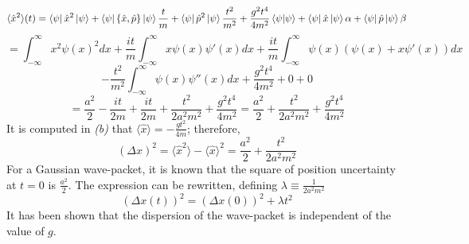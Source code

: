 \begin{sol}
\begin{enumerate}[label=\textbf{(\alph*)}]
\begin{equation}
	\langle\hat x^2\rangle(t)=\bra\psi\hat x^2\ket\psi+\bra\psi\{\hat x,\hat p\}\ket\psi\frac{t}{m}+\bra\psi\hat p^2\ket\psi\frac{t^2}{m^2}+\frac{g^2t^4}{4m^2}\braket{\psi}{\psi}+\bra\psi\hat x\ket\psi\alpha+\bra\psi\hat p\ket\psi\beta
\end{equation} 
\begin{equation}
	=\int_{-\infty}^\infty x^2\psi(x)^2dx+\frac{it}{m}\int_{-\infty}^\infty x\psi(x)\psi'(x)dx+\frac{it}{m}\int_{-\infty}^\infty\psi(x)(\psi(x)+x\psi'(x))dx
\end{equation}
\begin{equation}
	-\frac{t^2}{m^2}\int_{-\infty}^\infty\psi(x)\psi''(x)dx+\frac{g^2t^4}{4m^2}+0+0
\end{equation}
\begin{equation}
	=\frac{a^2}{2}-\frac{it}{2m}+\frac{it}{2m}+\frac{t^2}{2a^2m^2}+\frac{g^2t^4}{4m^2}=\frac{a^2}{2}+\frac{t^2}{2a^2m^2}+\frac{g^2t^4}{4m^2}
\end{equation} 
It is computed in \textit{(b)} that $\displaystyle{\langle\hat x\rangle=-\frac{gt^2}{4m}}$; therefore,
\begin{equation}
	(\Delta x)^2=\langle\hat x^2\rangle-\langle\hat x\rangle^2=\frac{a^2}{2}+\frac{t^2}{2a^2m^2}
\end{equation}
For a Gaussian wave-packet, it is known that the square of position uncertainty at $t=0$ is $\frac{a^2}{2}$. The expression can be rewritten, defining $\lambda\equiv\frac{1}{2a^2m^2}$
\begin{equation}
	(\Delta x(t))^2=(\Delta x(0))^2+\lambda t^2
\end{equation}
It has been shown that the dispersion of the wave-packet is independent of the value of $g$.

\end{enumerate}
\end{sol}